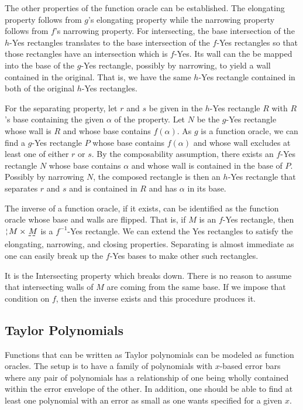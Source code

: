 \documentclass[12pt]{article}
\begin{document}
The other properties of the function oracle can be established. The elongating property follows from $g$'s elongating property while the narrowing property follows from $f$'s narrowing property. For intersecting, the base intersection of the $h$-Yes rectangles translates to the base intersection of the $f$-Yes rectangles so that those rectangles have an intersection which is $f$-Yes. Its wall can the be mapped into the base of the $g$-Yes rectangle, possibly by narrowing, to yield a wall contained in the original. That is, we have the same $h$-Yes rectangle contained in both of the original $h$-Yes rectangles. 

For the separating property, let $r$ and $s$ be given in the $h$-Yes rectangle $R$ with $R$'s base containing the given $\alpha$ of the property. Let $N$ be the $g$-Yes rectangle whose wall is $R$ and whose base contains $f(\alpha)$. As $g$ is a function oracle, we can find a $g$-Yes rectangle $P$ whose base contains $f(\alpha)$ and whose wall excludes at least one of either $r$ or $s$. By the composability assumption, there exists an $f$-Yes rectangle $N$ whose base contains $\alpha$  and whose wall is contained in the base of $P$. Possibly by narrowing $N$, the composed rectangle is then an $h$-Yes rectangle that separates $r$ and $s$ and is contained in $R$ and has $\alpha$ in its base. 


The inverse of a function oracle, if it exists, can be identified as the function oracle whose base and walls are flipped. That is, if $M$ is an $f$-Yes rectangle, then $\wall{M} \times \base{M}$ is a $f^{-1}$-Yes rectangle. We can extend the Yes rectangles to satisfy the elongating, narrowing, and closing properties. Separating is almost immediate as one can easily break up the $f$-Yes bases to make other such rectangles.

It is the Intersecting property which breaks down. There is no reason to assume that intersecting walls of $M$ are coming from the same base. If we impose that condition on $f$, then the inverse exists and this procedure produces it. 



\subsection{Taylor Polynomials}

Functions that can be written as Taylor polynomials can be modeled as function oracles. The setup is to have a family of polynomials with $x$-based error bars where any pair of polynomials has a relationship of one being wholly contained within the error envelope of the other. In addition, one should be able to find at least one polynomial with an error as small as one wants specified for a given $x$. 
\end{document}
